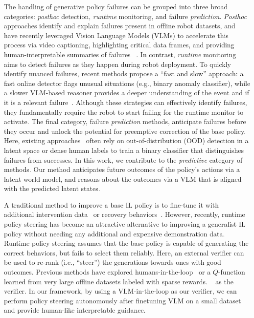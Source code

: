 The handling of generative policy failures can be grouped into three broad categories: \textit{posthoc} detection, \textit{runtime} monitoring, and failure \textit{prediction}. 
\textit{Posthoc} approaches identify and explain failures present in offline robot datasets, and have recently leveraged Vision Language Models (VLMs) to accelerate this process via video captioning, highlighting critical data frames, and providing human-interpretable summaries of failures ~\citep{duanaha, guan2024task,liu2023reflect, wangcan}. 
In contrast, \textit{runtime} monitoring aims to detect failures as they happen during robot deployment.
To quickly identify nuanced failures, recent methods propose a ``fast and slow'' approach: a fast online detector flags unusual situations (e.g., binary anomaly classifier), while a slower VLM-based reasoner provides a deeper understanding of the event and if it is a relevant failure~\citep{agiaunpacking,SinhaElhafsiEtAl2024}. 
Although these strategies can effectively identify failures, they fundamentally require the robot to start failing for the runtime monitor to activate. 
The final category, failure \textit{prediction} methods, anticipate failures before they occur and unlock the potential for preemptive correction of the base policy. 
Here, existing approaches~\citep{kambara2025futuresuccesspredictionopenvocabulary,liu2023modelbased,liumulti} often rely on out-of-distribution (OOD) detection in a latent space or dense human labels to train a binary classifier that distinguishes failures from successes. 
In this work, we contribute to the \textit{predictive} category of methods. Our method anticipates future outcomes of the policy's actions via a latent world model, and reasons about the outcomes via a VLM that is aligned with the predicted latent states. 

A traditional method to improve a base IL policy is to fine-tune it with additional intervention data~\citep{liumulti} or recovery behaviors~\citep{shafiullah2024supervised}. 
However, recently, runtime policy steering has become an attractive alternative to improving a generalist IL policy \cite{nakamoto2024steering, wang2024inference} without needing any additional and expensive demonstration data.  
Runtime policy steering assumes that the base policy is capable of generating the correct behaviors, but fails to select them reliably. 
Here, an external verifier can be used to re-rank (i.e., ``steer'') the generations towards ones with good outcomes. 
Previous methods have explored humans-in-the-loop~\citep{wang2024inference} or a $Q$-function learned from very large offline datasets labeled with sparse rewards. ~\citep{nakamoto2024steering} as the verifier. In our framework, by using a VLM-in-the-loop as our verifier, we can perform policy steering autonomously after finetuning VLM on a small dataset and provide human-like interpretable guidance.


    









  
  

     







    







      

